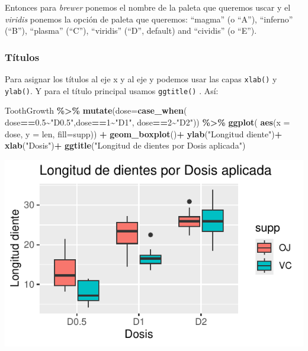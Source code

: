 \documentclass[
]{book}
\newenvironment{Shaded}{\begin{snugshade}}{\end{snugshade}}
\newcommand{\AttributeTok}[1]{\textcolor[rgb]{0.13,0.29,0.53}{#1}}
\newcommand{\DecValTok}[1]{\textcolor[rgb]{0.00,0.00,0.81}{#1}}
\newcommand{\FloatTok}[1]{\textcolor[rgb]{0.00,0.00,0.81}{#1}}
\newcommand{\FunctionTok}[1]{\textcolor[rgb]{0.13,0.29,0.53}{\textbf{#1}}}
\newcommand{\NormalTok}[1]{#1}
\newcommand{\SpecialCharTok}[1]{\textcolor[rgb]{0.81,0.36,0.00}{\textbf{#1}}}
\newcommand{\StringTok}[1]{\textcolor[rgb]{0.31,0.60,0.02}{#1}}
\begin{document}
\hfill\break

Entonces para \emph{brewer} ponemos el nombre de la paleta que queremos uscar y el \emph{viridis} ponemos la opción de paleta que queremos: ``magma'' (o ``A''), ``inferno'' (``B''), ``plasma'' (``C''), ``viridis'' (``D'', default) and ``cividis'' (o ``E'').

\subsubsection{Títulos}\label{tuxedtulos}

Para asignar los títulos al eje x y al eje y podemos usar las capas \texttt{xlab()} y \texttt{ylab()}.
Y para el título principal usamos \texttt{ggtitle()} .
Así:

\begin{Shaded}
\begin{Highlighting}[]
\NormalTok{ToothGrowth }\SpecialCharTok{\%\textgreater{}\%}  \FunctionTok{mutate}\NormalTok{(}\AttributeTok{dose=}\FunctionTok{case\_when}\NormalTok{(}
\NormalTok{  dose}\SpecialCharTok{==}\FloatTok{0.5}\SpecialCharTok{\textasciitilde{}}\StringTok{"D0.5"}\NormalTok{,dose}\SpecialCharTok{==}\DecValTok{1}\SpecialCharTok{\textasciitilde{}}\StringTok{"D1"}\NormalTok{, dose}\SpecialCharTok{==}\DecValTok{2}\SpecialCharTok{\textasciitilde{}}\StringTok{"D2"}\NormalTok{)) }\SpecialCharTok{\%\textgreater{}\%} \FunctionTok{ggplot}\NormalTok{(}
    \FunctionTok{aes}\NormalTok{(}\AttributeTok{x =}\NormalTok{ dose, }\AttributeTok{y =}\NormalTok{ len, }\AttributeTok{fill=}\NormalTok{supp)) }\SpecialCharTok{+}  \FunctionTok{geom\_boxplot}\NormalTok{()}\SpecialCharTok{+}
  \FunctionTok{ylab}\NormalTok{(}\StringTok{"Longitud diente"}\NormalTok{)}\SpecialCharTok{+}
  \FunctionTok{xlab}\NormalTok{(}\StringTok{"Dosis"}\NormalTok{)}\SpecialCharTok{+}
  \FunctionTok{ggtitle}\NormalTok{(}\StringTok{"Longitud de dientes por Dosis aplicada"}\NormalTok{)}
\end{Highlighting}
\end{Shaded}

\begin{center}\includegraphics{R_Manual_files/figure-latex/unnamed-chunk-216-1} \end{center}
\end{document}
